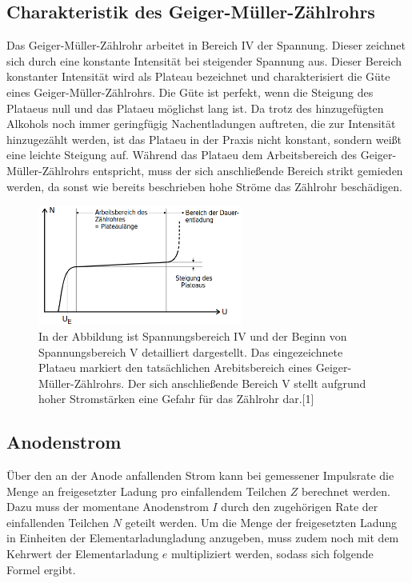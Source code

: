 \documentclass[titlepage = firstcover]{scrartcl}
\begin{document}
                \FloatBarrier
            

        \subsection{Charakteristik des Geiger-Müller-Zählrohrs}
            Das Geiger-Müller-Zählrohr arbeitet in Bereich IV der Spannung. Dieser zeichnet sich durch eine konstante Intensität bei steigender Spannung aus. Dieser Bereich konstanter Intensität
            wird als Plateau bezeichnet und charakterisiert die Güte eines Geiger-Müller-Zählrohrs. Die Güte ist perfekt, wenn die Steigung des Plataeus null und das Plataeu möglichst lang ist. Da 
            trotz des hinzugefügten Alkohols noch immer geringfügig Nachentladungen auftreten, die zur Intensität hinzugezählt werden, ist das Plataeu in der Praxis nicht konstant, sondern weißt eine 
            leichte Steigung auf. Während das Plataeu dem Arbeitsbereich des Geiger-Müller-Zählrohrs entspricht, muss der sich anschließende Bereich strikt gemieden werden, da sonst wie bereits 
            beschrieben hohe Ströme das Zählrohr beschädigen.

            \FloatBarrier

            \begin{figure}[h]
              \centering
              \includegraphics[width = 0.6\textwidth]{Bilder/SchemaCharakteristik.png}
              \caption{In der Abbildung ist Spannungsbereich IV und der Beginn von Spannungsbereich V detailliert dargestellt. Das eingezeichnete Plataeu markiert den tatsächlichen Arebitsbereich eines Geiger-Müller-Zählrohrs. Der sich anschließende Bereich V stellt aufgrund hoher Stromstärken eine Gefahr für das Zählrohr dar.[1]}
              \label{fig:SchemaCharakteristik}
            \end{figure}

            \FloatBarrier

        \subsection{Anodenstrom}
            Über den an der Anode anfallenden Strom kann bei gemessener Impulsrate die Menge an freigesetzter Ladung pro einfallendem Teilchen $Z$ berechnet werden. Dazu muss der momentane Anodenstrom
            $I$ durch den zugehörigen Rate der einfallenden Teilchen $N$ geteilt werden. Um die Menge der freigesetzten Ladung in Einheiten der Elementarladungladung anzugeben, muss zudem noch 
            mit dem Kehrwert der Elementarladung $e$ multipliziert werden, sodass sich folgende Formel ergibt.
\end{document}

